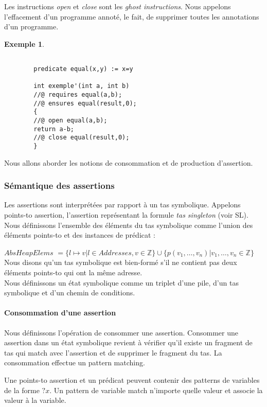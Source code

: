 \documentclass[11pt,openany]{article}
\newtheorem{exemple}{Exemple}
\begin{document}
	Les instructions \textit{open} et \textit{close} sont les \textit{ghost instructions}. Nous appelons l'effacement d'un programme annot\'e, le fait, de supprimer toutes les annotations d'un programme.
	\begin{exemple}
		\begin{lstlisting}
		
		predicate equal(x,y) := x=y
		
		int exemple'(int a, int b)
		//@ requires equal(a,b);
		//@ ensures equal(result,0);
		{
		//@ open equal(a,b);
		return a-b;
		//@ close equal(result,0);
		}
		\end{lstlisting}
	\end{exemple}
	Nous allons aborder les notions de consommation et de production d'assertion. 
		\subsubsection{S\'emantique des assertions}
	Les assertions sont interpr\'et\'ees par rapport \`a un tas symbolique.
	Appelons points-to assertion, l'assertion repr\'esentant la formule \textit{tas singleton} (voir SL). Nous d\'efinissons l'ensemble des \'el\'ements du tas symbolique comme l'union des \'el\'ements points-to et des instances de pr\'edicat :
	
	$AbsHeapElems$ $= \{l\mapsto v| l\in Addresses, v\in \mathbb{Z}\}\cup\{p(v_1,\ldots, v_n)|v_1,\ldots,v_n\in\mathbb{Z}\}$\\
	Nous disons qu'un tas symbolique est bien-form\'e s'il ne contient pas deux \'el\'ements points-to qui ont la m\^eme adresse.\\
	Nous d\'efinissons un \'etat symbolique comme un triplet d'une pile, d'un tas symbolique et d'un chemin de conditions.
	
			\paragraph{Consommation d'une assertion}
			Nous d\'efinissons l'op\'eration de consommer une assertion. Consommer une assertion dans un \'etat symbolique revient \`a v\'erifier qu'il existe un fragment de tas qui match avec l'assertion et de supprimer le fragment du tas. La consommation effectue un pattern matching.
	
	Une points-to assertion et un pr\'edicat peuvent contenir des patterns de variables de la forme $?x$. Un pattern de variable match n'importe quelle valeur et associe la valeur \`a la variable.
	
\end{document}
